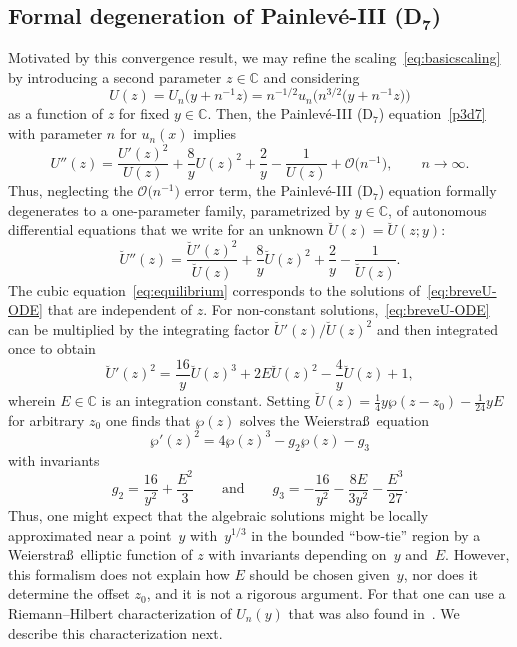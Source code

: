 \subsection[Formal degeneration of Painlev\'e-III (D\_7)]{Formal degeneration of Painlev\'e-III (D$\boldsymbol{_7}$)}
\label{sec:scaling}
Motivated by this convergence result, we may refine the scaling~\eqref{eq:basicscaling} by introducing a second parameter $z\in\mathbb{C}$ and considering
\begin{equation}
U(z)=U_n\bigl(y+n^{-1}z\bigr)=n^{-1/2}u_n\bigl(n^{3/2}\bigl(y+n^{-1}z\bigr)\bigr)
\label{eq:U-of-z}
\end{equation}
as a function of $z$ for fixed $y\in\mathbb{C}$. Then, the Painlev\'e-III (D$_7$) equation~\eqref{p3d7} with parameter $n$ for $u_n(x)$ implies
\begin{equation*}
U''(z)=\frac{U'(z)^2}{U(z)}+\frac{8}{y}U(z)^2+\frac{2}{y}-\frac{1}{U(z)} +\mathcal{O}\bigl(n^{-1}\bigr),\qquad n\to\infty.
\end{equation*}
Thus, neglecting the $\mathcal{O}\bigl(n^{-1}\bigr)$ error term, the Painlev\'e-III (D$_7$) equation formally degenerates to a one-parameter family, parametrized by $y\in\mathbb{C}$, of autonomous differential equations that we write for an unknown $\breve{U}(z)=\breve{U}(z;y)$:
\begin{equation}
\breve{U}''(z)=\frac{\breve{U}'(z)^2}{\breve{U}(z)}+\frac{8}{y}\breve{U}(z)^2+\frac{2}{y}-\frac{1}{\breve{U}(z)}.
\label{eq:breveU-ODE}
\end{equation}
The cubic equation~\eqref{eq:equilibrium} corresponds to the solutions of~\eqref{eq:breveU-ODE} that are independent of $z$. For non-constant solutions,~\eqref{eq:breveU-ODE} can be multiplied by the integrating factor $\breve{U}'(z)/\breve{U}(z)^2$ and then integrated once to obtain
\begin{equation}
\breve{U}'(z)^2=\frac{16}{y}\breve{U}(z)^3+2E\breve{U}(z)^2-\frac{4}{y}\breve{U}(z)+1,
\label{eq:breveU-first-order}
\end{equation}
wherein $E\in\mathbb{C}$ is an integration constant. Setting $\breve{U}(z)=\frac{1}{4}y\wp(z-z_0)-\frac{1}{24}yE$ for arbitrary $z_0$ one finds that $\wp(z)$ solves the Weierstra\ss\ equation~\cite[Chapter 23]{DLMF}
\begin{equation}
\wp'(z)^2=4\wp(z)^3-g_2\wp(z)-g_3
\label{eq:Weierstrass}
\end{equation}
with invariants
\begin{equation*}
g_2=\frac{16}{y^2}+\frac{E^2}{3}\qquad\text{and}\qquad
g_3=-\frac{16}{y^2}-\frac{8E}{3y^2}-\frac{E^3}{27}.
\end{equation*}
Thus, one might expect that the algebraic solutions might be locally approximated near a point~$y$ with~$y^{1/3}$ in the bounded ``bow-tie'' region by a Weierstra\ss\ elliptic function of $z$ with invariants depending on~$y$ and~$E$. However, this formalism does not explain how $E$ should be chosen given~$y$, nor does it determine the offset $z_0$, and it is not a rigorous argument. For that one can use a Riemann--Hilbert characterization of $U_n(y)$ that was also found in~\cite{BuckinghamM22}. We describe this characterization next.

